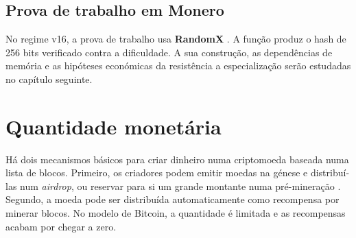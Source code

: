 

\subsection*{Prova de trabalho em Monero}
No regime v16, a prova de trabalho usa \textbf{RandomX}
\cite{randomx-pr-5549,randomx}. A função produz o hash de 256 bits verificado
contra a dificuldade. A sua construção, as dependências de memória e as
hipóteses económicas da resistência a especialização serão estudadas no
capítulo seguinte.



\section{Quantidade monetária}
\label{sec:money-supply}

Há dois mecanismos básicos para criar dinheiro numa criptomoeda baseada numa
lista de blocos.
Primeiro, os criadores podem emitir moedas na génese e distribuí-las num
\emph{airdrop}, ou reservar para si um grande montante numa pré-mineração
\cite{premine-description}. Segundo, a moeda pode ser distribuída
automaticamente como recompensa por minerar blocos. No modelo de Bitcoin, a
quantidade é limitada e as recompensas acabam por chegar a zero.

